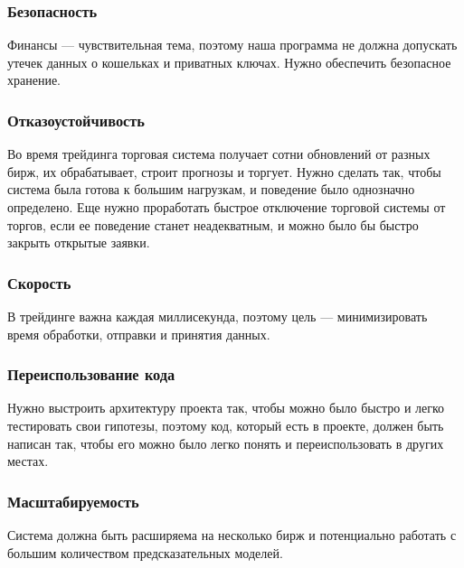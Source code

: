 \subsubsection{Безопасность}
Финансы — чувствительная тема, поэтому наша программа не должна допускать утечек данных о кошельках и приватных ключах. Нужно обеспечить безопасное хранение.

\subsubsection{Отказоустойчивость}
Во время трейдинга торговая система получает сотни обновлений от разных бирж, их обрабатывает, строит прогнозы и торгует. Нужно сделать так, чтобы система была готова к большим нагрузкам, и поведение было однозначно определено. Еще нужно проработать быстрое отключение торговой системы от торгов, если ее поведение станет неадекватным, и можно было бы быстро закрыть открытые заявки.

\subsubsection{Скорость}
В трейдинге важна каждая миллисекунда, поэтому цель — минимизировать время обработки, отправки и принятия данных.

\subsubsection{Переиспользование кода}
Нужно выстроить архитектуру проекта так, чтобы можно было быстро и легко тестировать свои гипотезы, поэтому код, который есть в проекте, должен быть написан так, чтобы его можно было легко понять и переиспользовать в других местах.

\subsubsection{Масштабируемость}
Система должна быть расширяема на несколько бирж и потенциально работать с большим количеством предсказательных моделей.